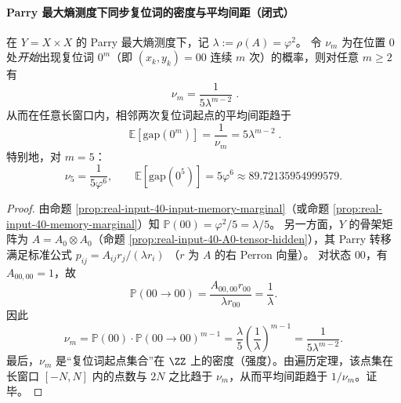 \paragraph{Parry 最大熵测度下同步复位词的密度与平均间距（闭式）}
\begin{proposition}\label{prop:real-input-reset-gap}
在 $Y=X\times X$ 的 Parry 最大熵测度下，记 $\lambda:=\rho(A)=\varphi^2$。
令 $\nu_m$ 为在位置 $0$ 处\emph{开始}出现复位词 $0^m$（即 $(x_k,y_k)=00$ 连续 $m$ 次）的概率，则对任意 $m\ge 2$ 有
\[
\boxed{\;
\nu_m=\frac{1}{5\lambda^{m-2}}\; }.
\]
从而在任意长窗口内，相邻两次复位词起点的平均间距趋于
\[
\boxed{\;
\mathbb{E}[\mathrm{gap}(0^m)]=\frac{1}{\nu_m}=5\lambda^{m-2}\; }.
\]
特别地，对 $m=5$：
\[
\nu_5=\frac{1}{5\varphi^6},
\qquad
\mathbb{E}[\mathrm{gap}(0^5)]=5\varphi^6\approx 89.72135954999579.
\]
\end{proposition}
\begin{proof}
由命题 \ref{prop:real-input-40-input-memory-marginal}（或命题 \ref{prop:real-input-40-memory-marginal}）知
\(
\mathbb{P}(00)=\varphi^2/5=\lambda/5
\)。
另一方面，$Y$ 的骨架矩阵为 $A=A_0\otimes A_0$（命题 \ref{prop:real-input-40-A0-tensor-hidden}），其 Parry 转移满足标准公式
\(
p_{ij}=A_{ij}r_j/(\lambda r_i)
\)
（$r$ 为 $A$ 的右 Perron 向量）。
对状态 $00$，有 $A_{00,00}=1$，故
\[
\mathbb{P}(00\to 00)=\frac{A_{00,00}r_{00}}{\lambda r_{00}}=\frac{1}{\lambda}.
\]
因此
\[
\nu_m
=\mathbb{P}(00)\cdot \mathbb{P}(00\to 00)^{m-1}
=\frac{\lambda}{5}\left(\frac{1}{\lambda}\right)^{m-1}
=\frac{1}{5\lambda^{m-2}}.
\]
最后，$\nu_m$ 是“复位词起点集合”在 $\ZZ$ 上的密度（强度）。由遍历定理，该点集在长窗口 $[-N,N]$ 内的点数与 $2N$ 之比趋于 $\nu_m$，从而平均间距趋于 $1/\nu_m$。证毕。
\end{proof}

